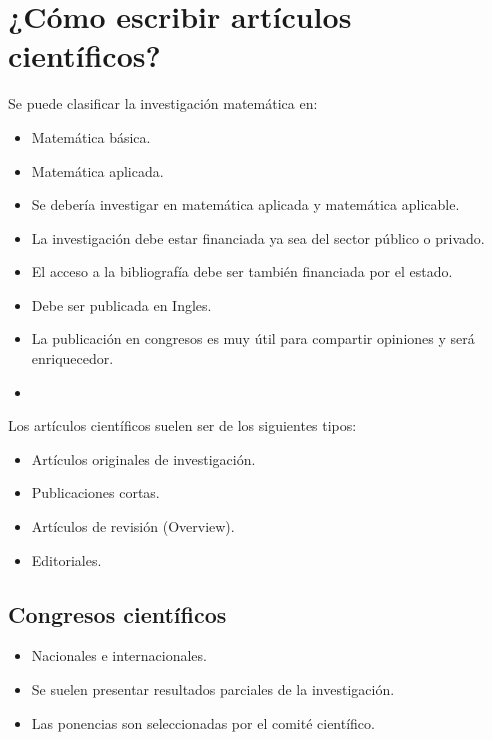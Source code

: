 \chapter{¿Cómo escribir artículos científicos?}

Se puede clasificar la investigación matemática en:
\begin{itemize}
    \item Matemática básica.
    \item Matemática aplicada.
\end{itemize}

\begin{itemize}
    \item Se debería investigar en matemática aplicada y matemática aplicable.
    \item La investigación debe estar financiada ya sea del sector público o privado.
    \item El acceso a la bibliografía debe ser también financiada por el estado.
    \item Debe ser publicada en Ingles.
    \item La publicación en congresos es muy útil para compartir opiniones y será enriquecedor.
    \item 
\end{itemize}

Los artículos científicos suelen ser de los siguientes tipos:

\begin{itemize}
    \item Artículos originales de investigación.
    \item Publicaciones cortas.
    \item Artículos de revisión (Overview).
    \item Editoriales.
\end{itemize}

\section{Congresos científicos}

\begin{itemize}
    \item Nacionales e internacionales.
    \item Se suelen presentar resultados parciales de la investigación.
    \item Las ponencias son seleccionadas por el comité científico.
\end{itemize}

